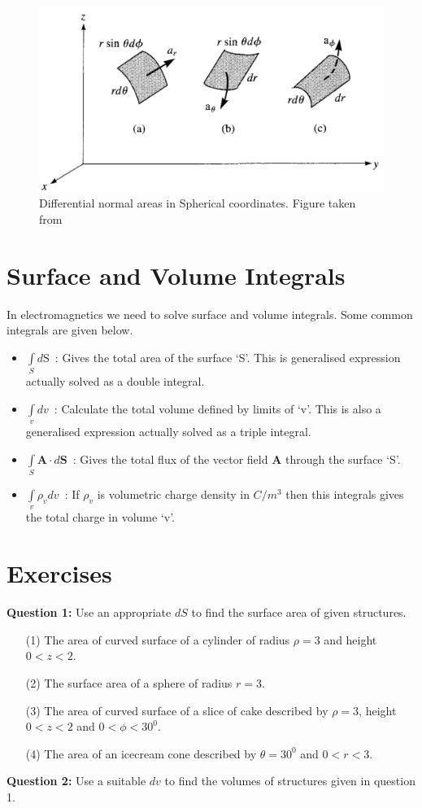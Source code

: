 \documentclass[12pt,a4paper]{article}
\begin{document}
\begin{figure}[h]
\centering
\includegraphics[scale=0.3]{Figure3-6S.png}
\caption{Differential normal areas in Spherical coordinates. Figure taken from~\cite[Figure 3.6, page 57]{Sadiku}}
\label{Spherical-differential-area}
\end{figure}
\section{Surface and Volume Integrals}
In electromagnetics we need to solve surface and volume integrals. Some common integrals are given below.
\begin{itemize}
\item $\int\limits_{S} d\mathrm{S}$~: Gives the total area of the surface `S'. This is generalised expression actually solved as a double integral.
\item $\int\limits_{v} dv$~: Calculate the total volume defined by limits of `v'. This is also a generalised expression actually solved as a triple integral.
\item $\int\limits_{S}\textbf{A}\cdot d\textbf{S}$~: Gives the total flux of the vector field \textbf{A} through the surface `S'.
\item $\int\limits_{v}\rho_v dv$~: If $\rho_v$ is volumetric charge density in $C/m^3$ then this integrals gives the total charge in volume `v'.
\end{itemize}
\section{Exercises}
\noindent\textbf{Question 1:} Use an appropriate $dS$ to find the surface area of given structures.
\begin{itemize}
\item[(1)] The area of curved surface of a cylinder of radius $\rho=3$ and height $0<z<2$.
\item[(2)] The surface area of a sphere of radius $r=3$.
\item[(3)] The area of curved surface of a slice of cake described by $\rho=3$, height $0<z<2$ and $0<\phi<30^0$.
\item[(4)] The area of an icecream cone described by $\theta=30^0$ and $0<r<3$.
\end{itemize}
\noindent\textbf{Question 2:} Use a suitable $dv$ to find the volumes of structures given in question 1.\\[0.2cm]


\end{document}
